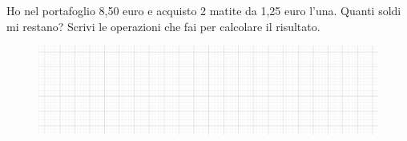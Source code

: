 \item Ho nel portafoglio 8,50 euro e acquisto 2 matite da 1,25 euro l'una. Quanti soldi mi restano? Scrivi le operazioni che fai per calcolare il risultato.
\begin{figure}[h]
	\centering
		\includegraphics[width=13cm]{figure/quadretti.png}
\end{figure}
